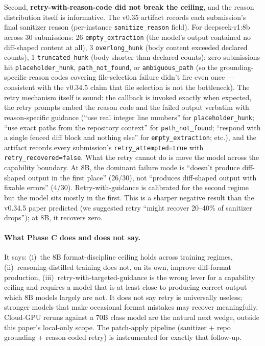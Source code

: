 Second, \textbf{retry-with-reason-code did not break the ceiling}, and the reason distribution itself is informative. The v0.35 artifact records each submission's final sanitizer reason (per-instance \texttt{sanitize\_reason} field). For deepseek-r1:8b across 30 submissions: 26 \texttt{empty\_extraction} (the model's output contained no diff-shaped content at all), 3 \texttt{overlong\_hunk} (body content exceeded declared counts), 1 \texttt{truncated\_hunk} (body shorter than declared counts); zero submissions hit \texttt{placeholder\_hunk}, \texttt{path\_not\_found}, or \texttt{ambiguous\_path} (so the grounding-specific reason codes covering file-selection failure didn't fire even once --- consistent with the v0.34.5 claim that file selection is not the bottleneck). The retry mechanism itself is sound: the callback is invoked exactly when expected, the retry prompts embed the reason code and the failed output verbatim with reason-specific guidance (``use real integer line numbers'' for \texttt{placeholder\_hunk}; ``use exact paths from the repository context'' for \texttt{path\_not\_found}; ``respond with a single fenced diff block and nothing else'' for \texttt{empty\_extraction}; etc.), and the artifact records every submission's \texttt{retry\_attempted=true} with \texttt{retry\_recovered=false}. What the retry cannot do is move the model across the capability boundary. At 8B, the dominant failure mode is ``doesn't produce diff-shaped output in the first place'' (26/30), not ``produces diff-shaped output with fixable errors'' (4/30). Retry-with-guidance is calibrated for the second regime but the model sits mostly in the first. This is a sharper negative result than the v0.34.5 paper predicted (we suggested retry ``might recover 20--40\% of sanitizer drops''); at 8B, it recovers zero.

\paragraph{What Phase C does and does not say.} It says: (i)~the 8B format-discipline ceiling holds across training regimes, (ii)~reasoning-distilled training does not, on its own, improve diff-format production, (iii)~retry-with-targeted-guidance is the wrong lever for a capability ceiling and requires a model that is at least close to producing correct output --- which 8B models largely are not. It does not say retry is universally useless; stronger models that make occasional format mistakes may recover meaningfully. Cloud-GPU reruns against a 70B class model are the natural next wedge, outside this paper's local-only scope. The patch-apply pipeline (sanitizer + repo grounding + reason-coded retry) is instrumented for exactly that follow-up.

